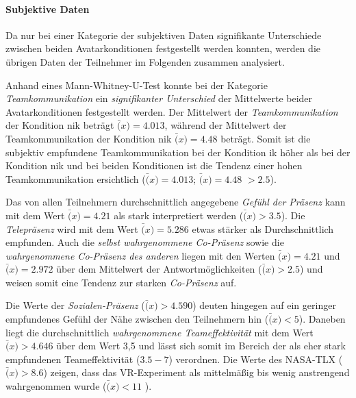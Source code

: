 \documentclass[a4paper,11pt]{article}%
\renewcommand{\\}{\vspace*{0.5\baselineskip} \newline}
\begin{document}
\paragraph{Subjektive Daten}

Da nur bei einer Kategorie der subjektiven Daten signifikante Unterschiede zwischen beiden Avatarkonditionen festgestellt werden konnten, werden die übrigen Daten der Teilnehmer im Folgenden zusammen analysiert.

Anhand eines Mann-Whitney-U-Test konnte bei der Kategorie \textit{Teamkommunikation} ein \textit{signifikanter Unterschied} der Mittelwerte beider Avatarkonditionen festgestellt werden. Der Mittelwert der \textit{Teamkommunikation} der Kondition \ac{nik} beträgt $\bar(x) = 4.013$, während der Mittelwert der Teamkommunikation der Kondition \ac{nik} $\bar(x) = 4.48$ beträgt. Somit ist die subjektiv empfundene Teamkommunikation bei der Kondition \ac{ik} höher als bei
der Kondition \ac{nik} und bei beiden Konditionen ist die Tendenz einer hohen Teamkommunikation ersichtlich ($\bar(x) = 4.013$; $\bar(x) = 4.48$ $ > 2.5$).

Das von allen Teilnehmern durchschnittlich angegebene \textit{Gefühl der Präsenz} kann mit dem Wert $\bar(x) = 4.21$ als stark interpretiert werden ($\bar(x) > 3.5$). Die \textit{Telepräsenz} wird mit dem Wert $\bar(x) = 5.286$ etwas stärker als Durchschnittlich empfunden. Auch die \textit{selbst wahrgenommene Co-Präsenz} sowie die \textit{wahrgenommene Co-Präsenz des anderen} liegen mit den Werten $\bar(x) = 4.21$ und $\bar(x) = 2.972$ über dem Mittelwert der Antwortmöglichkeiten ($\bar(x) > 2.5$) und weisen somit eine Tendenz zur starken \textit{Co-Präsenz} auf.

Die Werte der \textit{Sozialen-Präsenz} ($\bar(x) > 4.590$) deuten hingegen auf ein geringer empfundenes Gefühl der Nähe zwischen den Teilnehmern hin ($\bar(x) < 5$).
Daneben liegt die durchschnittlich \textit{wahrgenommene Teameffektivität} mit dem Wert $\bar(x) > 4.646$ über dem Wert 3,5 und lässt sich somit im Bereich der als eher stark empfundenen Teameffektivität ($3.5 - 7$) verordnen.
Die Werte des NASA-TLX ($\bar(x) > 8.6$) zeigen, dass das VR-Experiment als mittelmäßig bis wenig anstrengend wahrgenommen wurde ($\bar(x) < 11$ ).
\end{document}
